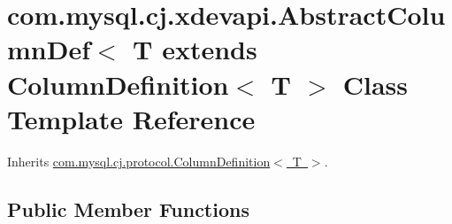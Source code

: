 \hypertarget{classcom_1_1mysql_1_1cj_1_1xdevapi_1_1_abstract_column_def}{}\section{com.\+mysql.\+cj.\+xdevapi.\+Abstract\+Column\+Def$<$ T extends Column\+Definition$<$ T $>$ Class Template Reference}
\label{classcom_1_1mysql_1_1cj_1_1xdevapi_1_1_abstract_column_def}


Inherits \mbox{\hyperlink{interfacecom_1_1mysql_1_1cj_1_1protocol_1_1_column_definition}{com.\+mysql.\+cj.\+protocol.\+Column\+Definition$<$ T $>$}}.

\subsection*{Public Member Functions}
